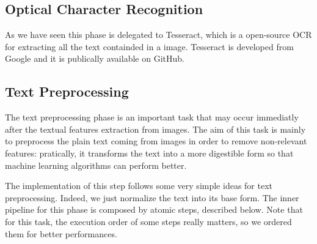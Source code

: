 \documentclass[10pt,twocolumn,letterpaper]{article}
\begin{document}
\subsection{Optical Character Recognition}

As we have seen this phase is delegated to Tesseract, which is a
open-source OCR for extracting all the text containded in a
image. Tesseract is developed from Google and it is publically
available on GitHub.

\subsection{Text Preprocessing}

The text preprocessing phase is an important task that may occur
immediatly after the textual features extraction from images. The aim
of this task is mainly to preprocess the plain text coming from images
in order to remove non-relevant features: pratically, it transforms the
text into a more digestible form so that machine learning algorithms
can perform better.

The implementation of this step follows some very simple ideas for
text preprocessing. Indeed, we just normalize the text into its base
form. The inner pipeline for this phase is composed by atomic steps,
described below. Note that for this task, the execution order of some
steps really matters, so we ordered them for better performances.
\end{document}
